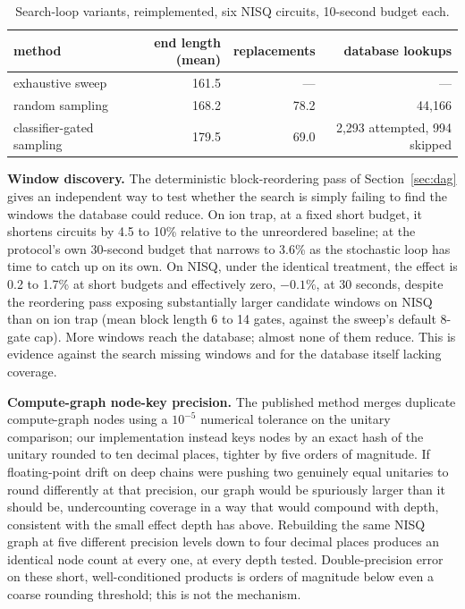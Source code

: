 \documentclass[11pt]{article}
\begin{document}
\begin{table}[H]
\centering
\caption{Search-loop variants, reimplemented, six NISQ circuits, 10-second
budget each.}
\label{tab:loop}
\begin{tabular}{lrrr}
\toprule
method & end length (mean) & replacements & database lookups \\
\midrule
exhaustive sweep     & 161.5 & --- & --- \\
random sampling      & 168.2 & 78.2 & 44{,}166 \\
classifier-gated sampling & 179.5 & 69.0 & 2{,}293 attempted, 994 skipped \\
\bottomrule
\end{tabular}
\end{table}

\textbf{Window discovery.} \label{sec:dag-result}
The deterministic block-reordering pass of Section~\ref{sec:dag} gives an
independent way to test whether the search is simply failing to find the
windows the database could reduce. On ion trap, at a fixed short budget,
it shortens circuits by 4.5 to 10\% relative to the unreordered baseline;
at the protocol's own 30-second budget that narrows to 3.6\% as the
stochastic loop has time to catch up on its own. On NISQ, under the
identical treatment, the effect is 0.2 to 1.7\% at short budgets and
effectively zero, $-0.1\%$, at 30 seconds, despite the reordering pass
exposing substantially larger candidate windows on NISQ than on ion trap
(mean block length 6 to 14 gates, against the sweep's default 8-gate cap).
More windows reach the database; almost none of them reduce. This is
evidence against the search missing windows and for the database itself
lacking coverage.

\textbf{Compute-graph node-key precision.} The published method merges
duplicate compute-graph nodes using a $10^{-5}$ numerical tolerance on the
unitary comparison; our implementation instead keys nodes by an exact hash
of the unitary rounded to ten decimal places, tighter by five orders of
magnitude. If floating-point drift on deep chains were pushing two
genuinely equal unitaries to round differently at that precision, our
graph would be spuriously larger than it should be, undercounting coverage
in a way that would compound with depth, consistent with the small effect
depth has above. Rebuilding the same NISQ graph at five different
precision levels down to four decimal places produces an identical node
count at every one, at every depth tested. Double-precision error on these
short, well-conditioned products is orders of magnitude below even a
coarse rounding threshold; this is not the mechanism.
\end{document}
